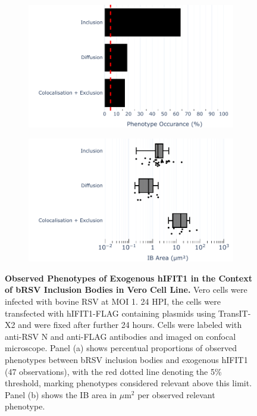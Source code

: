 \begin{figure}
    \begin{subfigure}{0.495\textwidth}
        \caption{}
        \includegraphics[width=1\linewidth]{09. Chapter 4/Figs/02. Overexpression/01. IFIT1/04. bar_i1_brsv.pdf} 
    \end{subfigure}
    \begin{subfigure}{0.495\textwidth}
        \caption{}
        \includegraphics[width=1\linewidth]{09. Chapter 4/Figs/02. Overexpression/01. IFIT1/05. box_i1_brsv.pdf}
    \end{subfigure}
    \caption[Observed Phenotypes of Exogenous hIFIT1 in the Context of bRSV Inclusion Bodies in Vero Cell Line.]{\textbf{Observed Phenotypes of Exogenous hIFIT1 in the Context of bRSV Inclusion Bodies in Vero Cell Line.} Vero cells were infected with bovine RSV at MOI 1. 24 HPI, the cells were transfected with hIFIT1-FLAG containing plasmids using TransIT-X2 and were fixed after further 24 hours. Cells were labeled with anti-RSV N and anti-FLAG antibodies and imaged on confocal microscope. Panel (a) shows percentual proportions of observed phenotypes between bRSV inclusion bodies and exogenous hIFIT1 (47 observations), with the red dotted line denoting the 5\% threshold, marking phenotypes considered relevant above this limit. Panel (b) shows the IB area in \(\mu \mbox{m}^2\) per observed relevant phenotype.}
    \label{fig:Observed Phenotypes of Exogenous hIFIT1 in the Context of bRSV Inclusion Bodies in VERO Cell Line}
\end{figure}

